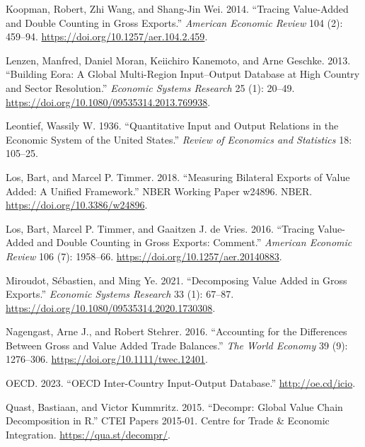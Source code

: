 \begin{CSLReferences}{1}{0}
\leavevmode{}%
Koopman, Robert, Zhi Wang, and Shang-Jin Wei. 2014. {``Tracing {Value}-{Added} and {Double} {Counting} in {Gross} {Exports}.''} \emph{American Economic Review} 104 (2): 459--94. \url{https://doi.org/10.1257/aer.104.2.459}.

\leavevmode{}%
Lenzen, Manfred, Daniel Moran, Keiichiro Kanemoto, and Arne Geschke. 2013. {``Building {Eora}: {A} {Global} {Multi}-{Region} {Input}--{Output} {Database} at {High} {Country} and {Sector} {Resolution}.''} \emph{Economic Systems Research} 25 (1): 20--49. \url{https://doi.org/10.1080/09535314.2013.769938}.

\leavevmode{}%
Leontief, Wassily W. 1936. {``Quantitative {Input} and {Output} {Relations} in the {Economic} {System} of the {United} {States}.''} \emph{Review of Economics and Statistics} 18: 105--25.

\leavevmode{}%
Los, Bart, and Marcel P. Timmer. 2018. {``Measuring {Bilateral} {Exports} of {Value} {Added}: {A} {Unified} {Framework}.''} NBER Working Paper w24896. NBER. \url{https://doi.org/10.3386/w24896}.

\leavevmode{}%
Los, Bart, Marcel P. Timmer, and Gaaitzen J. de Vries. 2016. {``Tracing {Value}-{Added} and {Double} {Counting} in {Gross} {Exports}: {Comment}.''} \emph{American Economic Review} 106 (7): 1958--66. \url{https://doi.org/10.1257/aer.20140883}.

\leavevmode{}%
Miroudot, Sébastien, and Ming Ye. 2021. {``Decomposing {Value} {Added} in {Gross} {Exports}.''} \emph{Economic Systems Research} 33 (1): 67--87. \url{https://doi.org/10.1080/09535314.2020.1730308}.

\leavevmode{}%
Nagengast, Arne J., and Robert Stehrer. 2016. {``Accounting for the {Differences} {Between} {Gross} and {Value} {Added} {Trade} {Balances}.''} \emph{The World Economy} 39 (9): 1276--306. \url{https://doi.org/10.1111/twec.12401}.

\leavevmode{}%
OECD. 2023. {``{OECD} {Inter}-{Country} {Input}-{Output} {Database}.''} \url{http://oe.cd/icio}.

\leavevmode{}%
Quast, Bastiaan, and Victor Kummritz. 2015. {``Decompr: {Global} {Value} {Chain} {Decomposition} in {R}.''} CTEI Papers 2015-01. Centre for Trade \& Economic Integration. \url{https://qua.st/decompr/}.


\end{CSLReferences}
